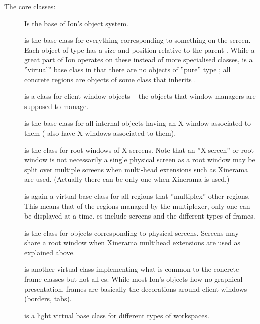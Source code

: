 The core classes:

\begin{description}
  \item[]
    Is the base of Ion's object system.
    
  \item[]
    is the base class for everything corresponding to something on the
    screen. Each object of type  has a size and  position
    relative to the parent . While a great part of Ion 
    operates on these instead of more specialised classes, 
    is a ''virtual''  base class in that there are no objects of ''pure''
    type ; all concrete regions are objects of some class 
    that inherits .

  \item[] is a class for
    client window objects -- the objects that window managers are
    supposed to manage.

  \item[] is the base class for all
    internal objects having an X window associated to them
    ( also have X windows associated to them).
    
  \item[] is the class for
    root windows of X screens.
    Note that an ''X screen'' or root window is not necessarily a
    single  physical screen as a root window
    may be split over multiple screens when multi-head extensions 
    such as Xinerama are used. (Actually there
    can be only one  when Xinerama is used.)
	
  \item[] is again a virtual base class for all regions that
    ''multiplex'' other regions. This means that of the regions managed by
    the multiplexer, only one can be displayed at a time. es 
    include screens and the different types of frames.
    
  \item[] is the class for objects
    corresponding to physical screens. Screens may share a root
    window when Xinerama multihead extensions are used as explained
    above.

  \item[] is another virtual class
    implementing what is common to the concrete frame classes but not
    all es. While most Ion's objects how no graphical 
    presentation, frames are basically the decorations around client
    windows (borders, tabs).

  \item[] is a light virtual base class
    for different types of workspaces.
\end{description}


